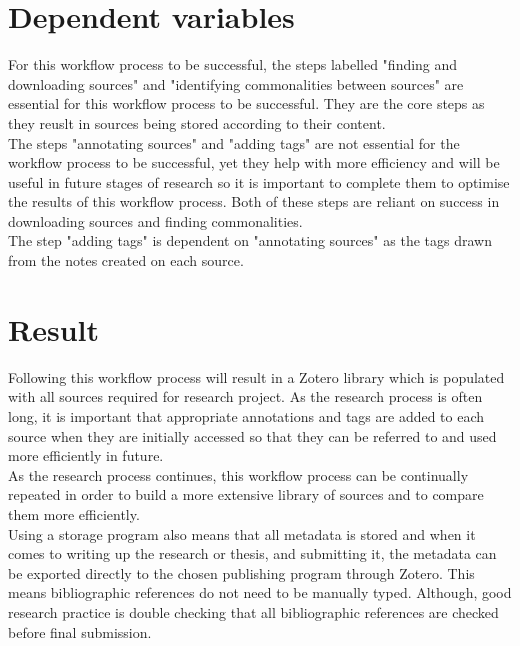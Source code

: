 \documentclass{article}
\begin{document}
\section{Dependent variables}
For this workflow process to be successful, the steps labelled "finding and downloading sources" and "identifying commonalities between sources" are essential for this workflow process to be successful. They are the core steps as they reuslt in sources being stored according to their content.\\
The steps "annotating sources" and "adding tags" are not essential for the workflow process to be successful, yet they help with more efficiency and will be useful in future stages of research so it is important to complete them to optimise the results of this workflow process. Both of these steps are reliant on success in downloading sources and finding commonalities.\\
The step "adding tags" is dependent on "annotating sources" as the tags drawn from the notes created on each source.  

\section{Result}
Following this workflow process will result in a Zotero library which is populated with all sources required for research project. As the research process is often long, it is important that appropriate annotations and tags are added to each source when they are initially accessed so that they can be referred to and used more efficiently in future.\\
As the research process continues, this workflow process can be continually repeated in order to build a more extensive library of sources and to compare them more efficiently.\\
Using a storage program also means that all metadata is stored and when it comes to writing up the research or thesis, and submitting it, the metadata can be exported directly to the chosen publishing program through Zotero. This means bibliographic references do not need to be manually typed. Although, good research practice is double checking that all bibliographic references are checked before final submission.
\end{document}
